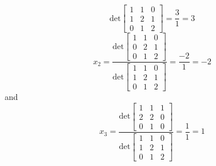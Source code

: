 \begin{enumerate}
\begin{mdframed}[style=MyFrame]
\begin{equation}
{                        }
                        {
                            \text{det}
                            \begin{bmatrix}
                                1   &   1   &   0   \\
                                1   &   2   &   1   \\
                                0   &   1   &   2
                            \end{bmatrix}
                        }
                        =
                        \frac{3}{1} = 3
            \end{equation}
            \begin{equation}
                x_{2} = \frac{
                            \text{det}
                            \begin{bmatrix}
                                1   &   1   &   0   \\
                                0   &   2   &   1   \\
                                0   &   1   &   2
                            \end{bmatrix}
                        }
                        {
                            \text{det}
                            \begin{bmatrix}
                                1   &   1   &   0   \\
                                1   &   2   &   1   \\
                                0   &   1   &   2
                            \end{bmatrix}
                        }
                        =
                        \frac{-2}{1} = -2
            \end{equation}
            and
            \begin{equation}
                x_{3} = \frac{
                            \text{det}
                            \begin{bmatrix}
                                1   &   1   &   1   \\
                                2   &   2   &   0   \\
                                0   &   1   &   0
                            \end{bmatrix}
                        }
                        {
                            \text{det}
                            \begin{bmatrix}
                                1   &   1   &   0   \\
                                1   &   2   &   1   \\
                                0   &   1   &   2
                            \end{bmatrix}
                        }
                        =
                        \frac{1}{1} = 1
            \end{equation}
        \end{mdframed}


\end{enumerate}
